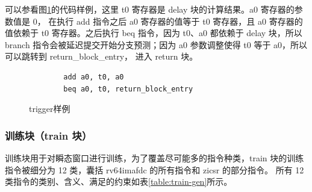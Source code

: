 可以参看图\ref{code:trigger-example}的代码样例，这里 t0 寄存器是 delay 块的计算结果。a0 寄存器的参数值是 0，
在执行 add 指令之后 a0 寄存器的值等于 t0 寄存器，且 a0 寄存器的值依赖于 t0 寄存器。之后执行 beq 指令，因为 t0、a0 都依赖于
delay 块，所以 branch 指令会被延迟提交开始分支预测；因为 a0 参数调整使得 t0 等于 a0，所以可以跳转到 return\_block\_entry，
进入 return 块。\par

\begin{figure}[htbp]
    \centering
    \begin{verbatim}
        add a0, t0, a0
        beq a0, t0, return_block_entry
    \end{verbatim}
    \caption{trigger样例}
    \label{code:trigger-example}
\end{figure}

\subsubsection{训练块（train 块）}
训练块用于对瞬态窗口进行训练，为了覆盖尽可能多的指令种类，train 块的训练指令被细分为 12 类，囊括 rv64imafdc 的所有指令和 zicsr 的部分指令。
所有 12 类指令的类别、含义、满足的约束如表\ref{table:train-gen}所示。

